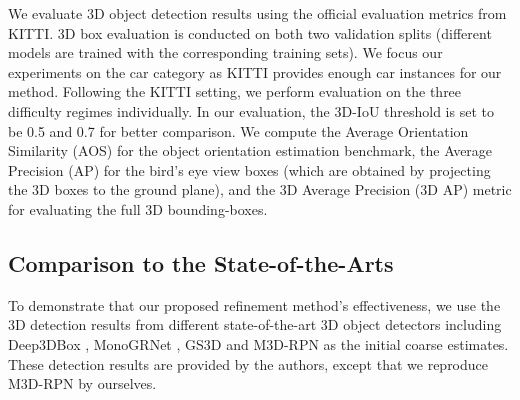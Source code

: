 \documentclass[runningheads]{llncs}
\begin{document}
We evaluate 3D object detection results using the official evaluation metrics from KITTI. 3D box evaluation is conducted on both two validation splits (different models are trained with the corresponding training sets). We focus our experiments on the car category as KITTI provides enough car instances for our method. Following the KITTI setting, we perform evaluation on the three difficulty regimes individually. In our evaluation, the 3D-IoU threshold is set to be 0.5 and 0.7 for better comparison. We compute the Average Orientation Similarity (AOS) for the object orientation estimation benchmark, the Average Precision (AP) for the bird's eye view boxes (which are obtained by projecting the 3D boxes to the ground plane), and the 3D Average Precision (3D AP) metric for evaluating the full 3D bounding-boxes.

\subsection{Comparison to the State-of-the-Arts}

To demonstrate that our proposed refinement method's effectiveness, we use the 3D detection results from different state-of-the-art 3D object detectors including Deep3DBox \cite{mousavian20173d}, MonoGRNet \cite{qin2019monogrnet}, GS3D \cite{li2019gs3d} and M3D-RPN \cite{brazil2019m3d} as the initial coarse estimates. These detection results are provided by the authors, except that we reproduce M3D-RPN by ourselves.
\end{document}
